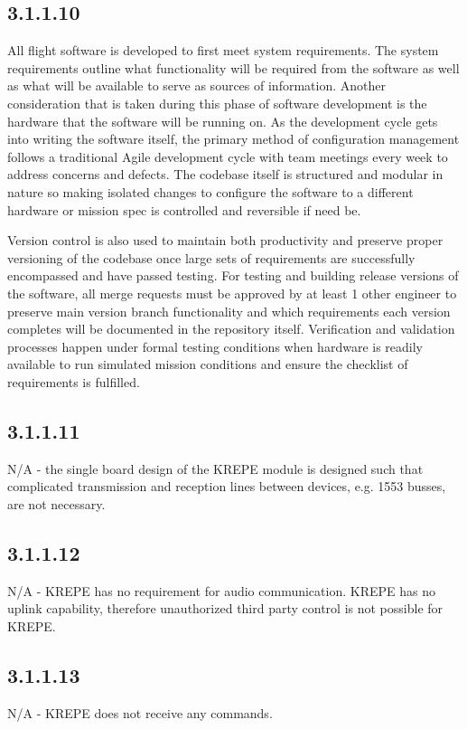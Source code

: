 \documentclass{article}
\begin{document}
\subsection{3.1.1.10}
All flight software is developed to first meet system requirements. The system requirements outline what functionality will be required from the software as well as what will be available to serve as sources of information. Another consideration that is taken during this phase of software development is the hardware that the software will be running on. As the development cycle gets into writing the software itself, the primary method of configuration management follows a traditional Agile development cycle with team meetings every week to address concerns and defects. The codebase itself is structured and modular in nature so making isolated changes to configure the software to a different hardware or mission spec is controlled and reversible if need be.

Version control is also used to maintain both productivity and preserve proper versioning of the codebase once large sets of requirements are successfully encompassed and have passed testing. For testing and building release versions of the software, all merge requests must be approved by at least 1 other engineer to preserve main version branch functionality and which requirements each version completes will be documented in the repository itself. Verification and validation processes happen under formal testing conditions when hardware is readily available to run simulated mission conditions and ensure the checklist of requirements is fulfilled. 

\subsection{3.1.1.11}
N/A - the single board design of the KREPE module is designed such that complicated transmission and reception lines between devices, e.g. 1553  busses, are not necessary.

\subsection{3.1.1.12}
N/A - KREPE has no requirement for audio communication. KREPE has no uplink capability, therefore unauthorized third party control is not possible for KREPE.

\subsection{3.1.1.13}
N/A - KREPE does not receive any commands.


%
%
\end{document}
